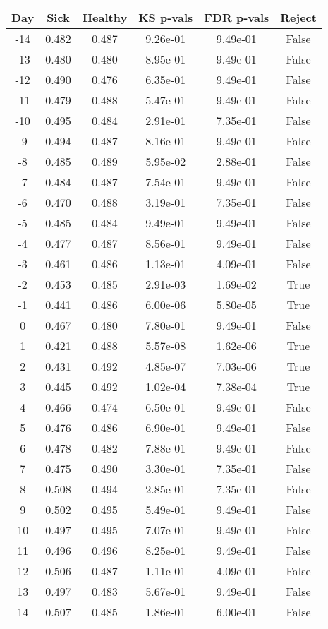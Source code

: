 \begin{tabular}{c|c|c|c|c|c}
Day &  Sick & Healthy &  KS p-vals & FDR p-vals & Reject\\
\hline
-14 & 0.482 &   0.487 &   9.26e-01 &   9.49e-01 &  False\\
-13 & 0.480 &   0.480 &   8.95e-01 &   9.49e-01 &  False\\
-12 & 0.490 &   0.476 &   6.35e-01 &   9.49e-01 &  False\\
-11 & 0.479 &   0.488 &   5.47e-01 &   9.49e-01 &  False\\
-10 & 0.495 &   0.484 &   2.91e-01 &   7.35e-01 &  False\\
 -9 & 0.494 &   0.487 &   8.16e-01 &   9.49e-01 &  False\\
 -8 & 0.485 &   0.489 &   5.95e-02 &   2.88e-01 &  False\\
 -7 & 0.484 &   0.487 &   7.54e-01 &   9.49e-01 &  False\\
 -6 & 0.470 &   0.488 &   3.19e-01 &   7.35e-01 &  False\\
 -5 & 0.485 &   0.484 &   9.49e-01 &   9.49e-01 &  False\\
 -4 & 0.477 &   0.487 &   8.56e-01 &   9.49e-01 &  False\\
 -3 & 0.461 &   0.486 &   1.13e-01 &   4.09e-01 &  False\\
 -2 & 0.453 &   0.485 &   2.91e-03 &   1.69e-02 &   True\\
 -1 & 0.441 &   0.486 &   6.00e-06 &   5.80e-05 &   True\\
  0 & 0.467 &   0.480 &   7.80e-01 &   9.49e-01 &  False\\
  1 & 0.421 &   0.488 &   5.57e-08 &   1.62e-06 &   True\\
  2 & 0.431 &   0.492 &   4.85e-07 &   7.03e-06 &   True\\
  3 & 0.445 &   0.492 &   1.02e-04 &   7.38e-04 &   True\\
  4 & 0.466 &   0.474 &   6.50e-01 &   9.49e-01 &  False\\
  5 & 0.476 &   0.486 &   6.90e-01 &   9.49e-01 &  False\\
  6 & 0.478 &   0.482 &   7.88e-01 &   9.49e-01 &  False\\
  7 & 0.475 &   0.490 &   3.30e-01 &   7.35e-01 &  False\\
  8 & 0.508 &   0.494 &   2.85e-01 &   7.35e-01 &  False\\
  9 & 0.502 &   0.495 &   5.49e-01 &   9.49e-01 &  False\\
 10 & 0.497 &   0.495 &   7.07e-01 &   9.49e-01 &  False\\
 11 & 0.496 &   0.496 &   8.25e-01 &   9.49e-01 &  False\\
 12 & 0.506 &   0.487 &   1.11e-01 &   4.09e-01 &  False\\
 13 & 0.497 &   0.483 &   5.67e-01 &   9.49e-01 &  False\\
 14 & 0.507 &   0.485 &   1.86e-01 &   6.00e-01 &  False\\
\end{tabular}
